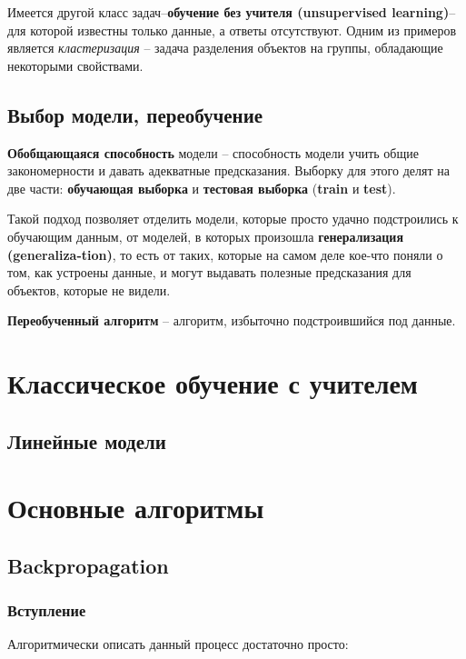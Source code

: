 \documentclass[a4paper, 10pt, openany]{book} %
\begin{document}
	Имеется другой класс задач--\textbf{обучение без учителя (unsupervised learning)}-- для которой известны только данные, а ответы отсутствуют. Одним из примеров является \textit{кластеризация} -- задача разделения объектов на группы, обладающие некоторыми свойствами.
	
	\section{Выбор модели, переобучение}
	
	\textbf{Обобщающаяся способность} модели -- способность модели учить общие закономерности и давать адекватные предсказания. Выборку для этого делят на две части: \textbf{обучающая выборка} и \textbf{тестовая выборка} (\textbf{train} и \textbf{test}). 
	
	Такой подход позволяет отделить модели, которые просто удачно подстроились к обучающим данным, от моделей, в которых произошла \textbf{генерализация (generaliza-tion)}, то есть от таких, которые на самом деле кое-что поняли о том, как устроены данные, и могут выдавать полезные предсказания для объектов, которые не видели.
	
	\textbf{Переобученный алгоритм} -- алгоритм, избыточно подстроившийся под данные.
	
	\chapter{Классическое обучение с учителем}
	
	\section{Линейные модели}
	
	\chapter{Основные алгоритмы}
	
	\section{Backpropagation}
	
	\subsection{Вступление}
	
	Алгоритмически описать данный процесс достаточно просто:
	
\end{document}
